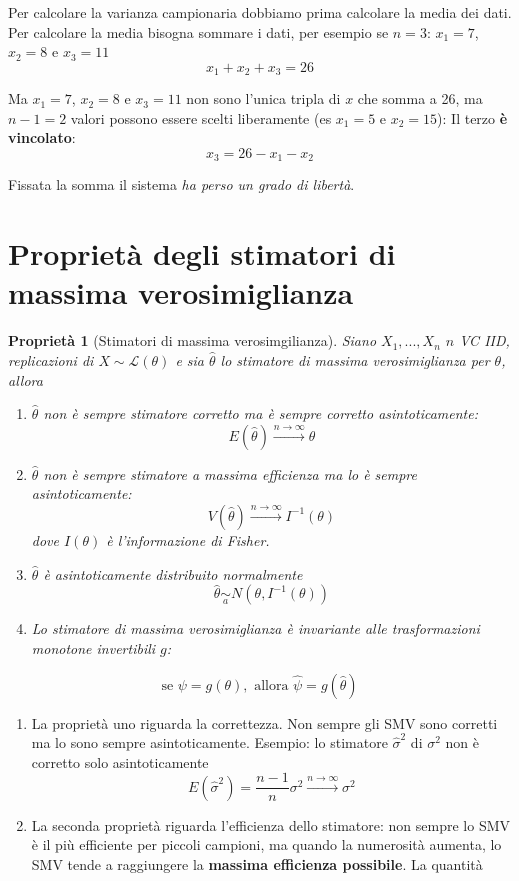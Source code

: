 \documentclass[
  11pt,
]{book}
\providecommand{\tightlist}{%
  \setlength{\itemsep}{0pt}\setlength{\parskip}{0pt}}
\theoremstyle{mytheoremstyle}
\newtheorem{proposition}{Proprietà}[section]
\theoremstyle{mydefstyle}
\begin{document}
Per calcolare la varianza campionaria dobbiamo prima calcolare la media dei dati.
Per calcolare la media bisogna sommare i dati, per esempio se \(n=3\):
\(x_1=7\), \(x_2=8\) e \(x_3=11\)
\[x_1+x_2+x_3 = 26\]

Ma \(x_1=7\), \(x_2=8\) e \(x_3=11\) non sono l'unica tripla di \(x\) che somma a 26, ma
\(n-1=2\) valori possono essere scelti liberamente (es \(x_1=5\) e \(x_2=15\)):
Il terzo \textbf{è vincolato}:
\[x_3=26-x_1-x_2\]

Fissata la somma il sistema \emph{ha perso un grado di libertà}.

\section{Proprietà degli stimatori di massima verosimiglianza}\label{proprietuxe0-degli-stimatori-di-massima-verosimiglianza}

\begin{info}

\begin{proposition}[Stimatori di massima verosimgilianza]
Siano \(X_1,...,X_n\) \(n\) VC IID, replicazioni di \(X\sim \mathscr{L}(\theta)\) e sia \(\hat\theta\) lo stimatore di massima verosimiglianza per \(\theta\), allora

\begin{enumerate}
\def\labelenumi{\arabic{enumi}.}
\item
  \(\hat\theta\) non è sempre stimatore corretto ma è sempre corretto asintoticamente:
  \[E(\hat\theta)\xrightarrow{n\to\infty}\theta\]
\item
  \(\hat\theta\) non è sempre stimatore a \emph{massima efficienza} ma lo è sempre asintoticamente:
  \[V(\hat\theta)\xrightarrow{n\to\infty}I^{-1}(\theta)\]
  dove \(I(\theta)\) è l'informazione di Fisher.
\item
  \(\hat\theta\) è asintoticamente distribuito normalmente
  \[\hat\theta\operatorname*{\sim}_a N(\theta,I^{-1}(\theta))\]
\item
  Lo stimatore di massima verosimiglianza è invariante alle trasformazioni monotone invertibili \(g\):
\end{enumerate}

\[ \text{se } \psi=g(\theta), \text{ allora } \hat\psi = g(\hat\theta)\]
\end{proposition}

\end{info}

\begin{enumerate}
\def\labelenumi{\arabic{enumi}.}
\tightlist
\item
  La proprietà uno riguarda la correttezza. Non sempre gli SMV sono corretti
  ma lo sono sempre asintoticamente. Esempio: lo stimatore \(\hat\sigma^2\) di \(\sigma^2\) non è corretto solo asintoticamente
  \[E(\hat\sigma^2)=\frac{n-1}{n}\sigma^2\xrightarrow{n\to\infty}\sigma^2\]
\item
  La seconda proprietà riguarda l'efficienza dello stimatore: non sempre lo SMV è il più efficiente per piccoli campioni, ma quando la numerosità aumenta, lo SMV tende a raggiungere la \textbf{massima efficienza possibile}. La quantità
\end{enumerate}
\end{document}
